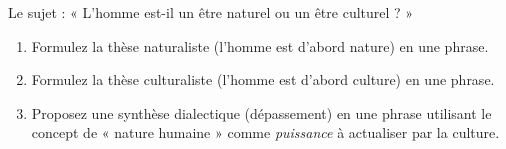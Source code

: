 \documentclass[11pt]{article}
\begin{document}
\begin{exercice}
Le sujet : « L'homme est-il un être naturel ou un être culturel ? »
\begin{enumerate}
    \item Formulez la thèse naturaliste (l'homme est d'abord nature) en une phrase.
    \item Formulez la thèse culturaliste (l'homme est d'abord culture) en une phrase.
    \item Proposez une synthèse dialectique (dépassement) en une phrase utilisant le concept de « nature humaine » comme \textit{puissance} à actualiser par la culture.
\end{enumerate}
\end{exercice}
\end{document}

